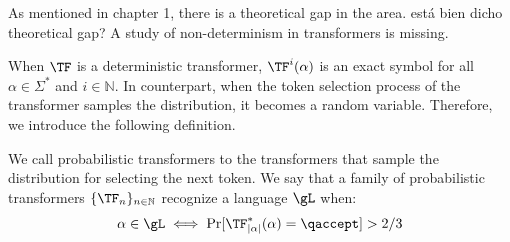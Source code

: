 

As mentioned in chapter 1, there is a theoretical gap in the area. {\color{orange} está bien dicho theoretical gap?}
A study of non-determinism in transformers is missing.

When $\TF$ is a deterministic transformer, $\TF^i(\alpha)$ is an exact symbol for all $\alpha \in \Sigma^*$ and $i \in \mathbb{N}$.
In counterpart, when the token selection process of the transformer samples the distribution, it becomes a random variable.
Therefore, we introduce the following definition.


\begin{definition}
    We call probabilistic transformers to the transformers that sample the distribution for selecting the next token.
    We say that a family of probabilistic transformers $\{\TF_n\}_{n \in \mathbb{N}}$ recognize a language $\gL$ when: 
    \[
    \alpha \in \gL \iff \Pr[\TF_{|\alpha|}^*(\alpha) = \qaccept] > 2/3
    \]
\end{definition}


